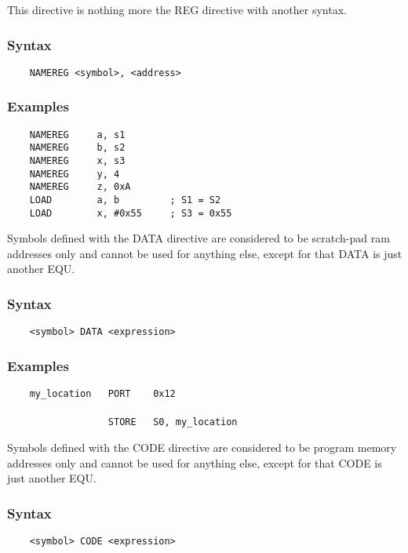     This directive is nothing more the REG directive with another syntax.

    \subsubsection{Syntax}
        \verb'    NAMEREG <symbol>, <address> '

    \subsubsection{Examples}
        \verb'    NAMEREG     a, s1'\\
        \verb'    NAMEREG     b, s2'\\
        \verb'    NAMEREG     x, s3'\\
        \verb'    NAMEREG     y, 4'\\
        \verb'    NAMEREG     z, 0xA'
        \verb''\\
        \verb'    LOAD        a, b         ; S1 = S2'\\
        \verb'    LOAD        x, #0x55     ; S3 = 0x55'

    Symbols defined with the DATA directive are considered to be scratch-pad ram addresses only and cannot be used for anything else, except for that DATA is just another EQU.

    \subsubsection{Syntax}
        \verb'    <symbol> DATA <expression>'

    \subsubsection{Examples}
        \verb'    my_location   PORT    0x12'\\
        \verb''\\
        \verb'                  STORE   S0, my_location'

    Symbols defined with the CODE directive are considered to be program memory addresses only and cannot be used for anything else, except for that CODE is just another EQU.

    \subsubsection{Syntax}
        \verb'    <symbol> CODE <expression>'

